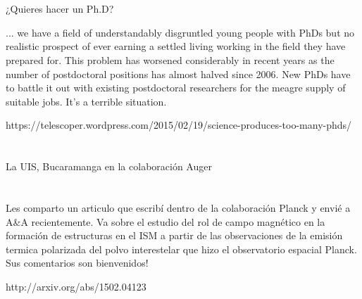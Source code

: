 \documentclass{book}
\begin{document}



\newpage


\renewcommand\thesection{\arabic{section}}
\renewcommand\thesubsection{\arabic{subsection}}


\section*{}


¿Quieres hacer un Ph.D?


... we have a field of understandably disgruntled young people with PhDs but no realistic prospect of ever earning a settled living working in the field they have prepared for. This problem has worsened considerably in recent  years as the number of postdoctoral positions has almost halved since 2006. New PhDs have to battle it out with existing postdoctoral researchers for the meagre supply of suitable jobs. It’s a terrible situation.

https://telescoper.wordpress.com/2015/02/19/science-produces-too-many-phds/

\section*{}

La UIS, Bucaramanga en la colaboración Auger 

\section*{}



Les comparto un articulo que escribí dentro de la colaboración Planck y envié a A\&A recientemente.
Va sobre el estudio del rol de campo magnético en la formación de estructuras en el ISM a partir de las observaciones de la emisión termica polarizada del polvo interestelar que hizo el observatorio espacial Planck.
Sus comentarios son bienvenidos!

http://arxiv.org/abs/1502.04123
\end{document}
